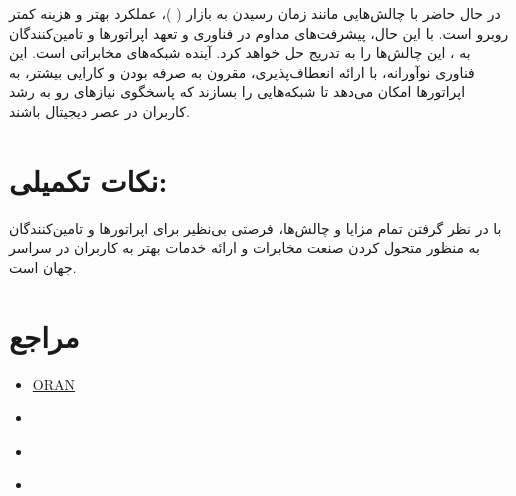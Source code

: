 \documentclass[landscape, 12pt]{report}
\begin{document}
 در حال حاضر با چالش‌هایی مانند زمان رسیدن به بازار (
 )، عملکرد بهتر و هزینه کمتر روبرو است. با این حال، پیشرفت‌های مداوم در فناوری و تعهد اپراتورها و تامین‌کنندگان به
  ، این چالش‌ها را به تدریج حل خواهد کرد.
 آینده شبکه‌های مخابراتی است. این فناوری نوآورانه، با ارائه انعطاف‌پذیری، مقرون به صرفه بودن و کارایی بیشتر، به اپراتورها امکان می‌دهد تا شبکه‌هایی را بسازند که پاسخگوی نیازهای رو به رشد کاربران در عصر دیجیتال باشند.
\section*{نکات تکمیلی:}

با در نظر گرفتن تمام مزایا و چالش‌ها،
   فرصتی بی‌نظیر برای اپراتورها و تامین‌کنندگان به منظور متحول کردن صنعت مخابرات و ارائه خدمات بهتر به کاربران در سراسر جهان است.

\section* {مراجع}
\begin{itemize}
	\item 
	\href{https://www.youtube.com/watch?v=Z9kJ8HT\_IVM} {ORAN}
	
	\item 
	\href{https://www.vmware.com/topics/glossary/content/vran-oran.html?resource=cat-1324900800#cat-1324900800}{}
	
	\item 
	\href{https://www.youtube.com/watch?v=\_Wd2zwdCQZI}{}
	
	\item 
	\href{https://www.youtube.com/watch?v=jYdfHSWbRBE}{}
\end{itemize}
\end{document}
